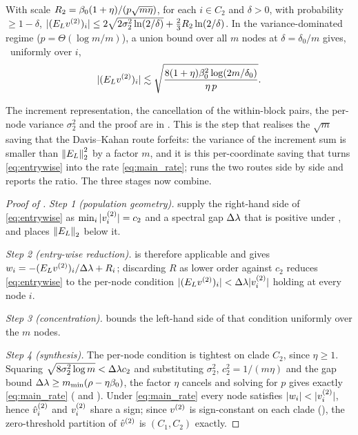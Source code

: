 \begin{lemma}\label{lem:pernode}
With scale $R_2=\beta_0(1+\eta)/(p\sqrt{m\eta})$, for each $i\in C_2$ and $\delta>0$,
with probability $\ge1-\delta$,
$|(E_{L}v^{(2)})_i|\le2\sqrt{2\sigma_2^2\ln(2/\delta)}+\tfrac23R_2\ln(2/\delta)$. In the
variance-dominated regime ($p=\Theta(\log m/m)$), a union bound over all $m$ nodes
at $\delta=\delta_0/m$ gives, \hp\ uniformly over $i$,
\begin{equation}\label{eq:concentration-bound}
   |(E_{L}v^{(2)})_i|\lesssim\sqrt{\frac{8(1+\eta)\beta_0^2\log(2m/\delta_0)}{\eta\,p}}.
\end{equation}
\end{lemma}
\noindent The increment representation, the cancellation of the within-block
pairs, the per-node variance $\sigma_2^2$ and the proof are in
. This is the step that realises the $\sqrt m$ saving that the
Davis--Kahan route forfeits: the variance of the increment sum is smaller than
$\left\lVert E_{L} \right\rVert_{2}^2$ by a factor $m$, and it is this per-coordinate saving that turns
\eqref{eq:entrywise} into the rate \eqref{eq:main_rate};  runs
the two routes side by side and  reports the ratio. The three
stages now combine.

\begin{proof}[Proof of ]
\emph{Step 1 (population geometry).}  supply the
right-hand side of \eqref{eq:entrywise} as $\min_i|v^{(2)}_i|=c_2$ and a spectral gap
$\Delta\lambda$ that is positive under , and 
places $\left\lVert E_{L} \right\rVert_{2}$ below it.

\emph{Step 2 (entry-wise reduction).}  is therefore applicable
and gives $w_i=-(E_{L}v^{(2)})_i/\Delta\lambda+R_i$; discarding $R$ as lower order against
$c_2$ reduces \eqref{eq:entrywise} to the per-node condition
$|(E_{L}v^{(2)})_i|<\Delta\lambda|v^{(2)}_i|$ holding at every node $i$.

\emph{Step 3 (concentration).}  bounds the left-hand side of
that condition uniformly over the $m$ nodes.

\emph{Step 4 (synthesis).} The per-node condition is tightest on clade $C_2$, since
$\eta\ge1$. Squaring $\sqrt{8\sigma_2^2\log m}<\Delta\lambda c_2$ and substituting
$\sigma_2^2$, $c_2^2=1/(m\eta)$ and the gap bound
$\Delta\lambda\ge m_{\min}(\rho-\eta\beta_0)$, the factor $\eta$ cancels and solving
for $p$ gives exactly \eqref{eq:main_rate}
( and ). Under \eqref{eq:main_rate} every node satisfies
$|w_i|<|\vv_i|$, hence $\hat v^{(2)}_i$ and $v^{(2)}_i$ share a sign; since $v^{(2)}$ is
sign-constant on each clade (), the zero-threshold partition of
$\hat v^{(2)}$ is $(C_1,C_2)$ exactly.
\end{proof}

